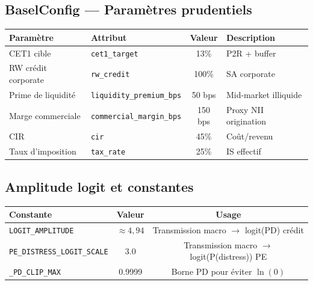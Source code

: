 \documentclass[12pt,a4paper]{article}
\begin{document}
\subsection{BaselConfig --- Param\`etres prudentiels}

\begin{center}
\begin{tabular}{llcl}
\toprule
\textbf{Param\`etre} & \textbf{Attribut} & \textbf{Valeur} & \textbf{Description} \\
\midrule
CET1 cible             & \texttt{cet1\_target}          & 13\%    & P2R + buffer \\
RW cr\'edit corporate  & \texttt{rw\_credit}            & 100\%   & SA corporate \\
Prime de liquidit\'e   & \texttt{liquidity\_premium\_bps} & 50 bps & Mid-market illiquide \\
Marge commerciale      & \texttt{commercial\_margin\_bps} & 150 bps & Proxy NII origination \\
CIR                    & \texttt{cir}                   & 45\%    & Co\^ut/revenu \\
Taux d'imposition      & \texttt{tax\_rate}             & 25\%    & IS effectif \\
\bottomrule
\end{tabular}
\end{center}

\subsection{Amplitude logit et constantes}

\begin{center}
\begin{tabular}{lcc}
\toprule
\textbf{Constante} & \textbf{Valeur} & \textbf{Usage} \\
\midrule
\texttt{LOGIT\_AMPLITUDE} & $\approx 4{,}94$\footnotemark & Transmission macro $\to$ logit(PD) cr\'edit \\
\texttt{PE\_DISTRESS\_LOGIT\_SCALE} & 3.0 & Transmission macro $\to$ logit(P(distress)) PE \\
\texttt{\_PD\_CLIP\_MAX} & 0.9999 & Borne PD pour \'eviter $\ln(0)$ \\
\bottomrule
\end{tabular}
\end{center}

\end{document}
